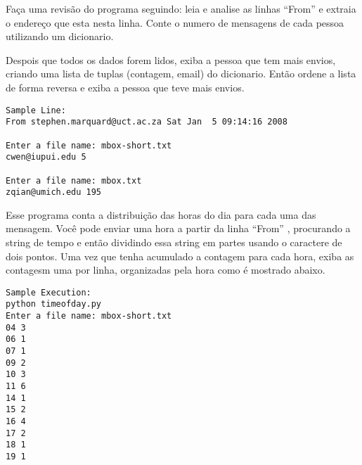 \begin{ex}
Faça uma revisão do programa seguindo: leia e
analise as linhas ``From'' e extraia o endereço
que esta nesta linha.   Conte o numero de mensagens
de cada pessoa utilizando um dicionario.

Despois que todos os dados forem lidos, exiba
a pessoa que tem mais envios, criando uma lista
de tuplas (contagem, email) do dicionario.   Então
ordene a lista de forma reversa e exiba a pessoa 
que teve mais envios.

\beforeverb
\begin{verbatim}
Sample Line:
From stephen.marquard@uct.ac.za Sat Jan  5 09:14:16 2008

Enter a file name: mbox-short.txt
cwen@iupui.edu 5

Enter a file name: mbox.txt
zqian@umich.edu 195
\end{verbatim}
\afterverb
\end{ex}
\begin{ex}
Esse programa conta a distribuição das horas do dia para cada uma
das mensagem. Você pode enviar uma hora a partir da linha ``From'' 
, procurando a string de tempo e então dividindo essa string em 
partes usando o caractere de dois pontos. Uma vez que tenha acumulado
a contagem para cada hora, exiba as contagesm uma por linha,
organizadas pela hora como é mostrado abaixo.
\beforeverb
\begin{verbatim}
Sample Execution:
python timeofday.py
Enter a file name: mbox-short.txt
04 3
06 1
07 1
09 2
10 3
11 6
14 1
15 2
16 4
17 2
18 1
19 1
\end{verbatim}
\afterverb
\end{ex}


